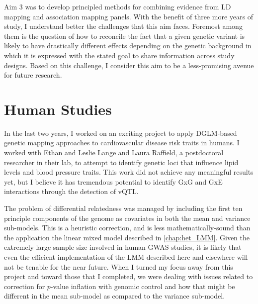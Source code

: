 Aim 3 was to develop principled methods for combining evidence from LD mapping and association mapping panels.
With the benefit of three more years of study, I understand better the challenges that this aim faces.
Foremost among them is the question of how to reconcile the fact that a given genetic variant is likely to have drastically different effects depending on the genetic background in which it is expressed with the stated goal to share information across study designs.
Based on this challenge, I consider this aim to be a less-promising avenue for future research.


\section{Human Studies}

In the last two years, I worked on an exciting project to apply DGLM-based genetic mapping approaches to cardiovascular disease risk traits in humans.
I worked with Ethan and Leslie Lange and Laura Raffield, a postdoctoral researcher in their lab, to attempt to identify genetic loci that influence lipid levels and blood pressure traits.
This work did not achieve any meaningful results yet, but I believe it has tremendous potential to identify GxG and GxE interactions through the detection of vQTL.

The problem of differential relatedness was managed by including the first ten principle components of the genome as covariates in both the mean and variance sub-models.
This is a heuristic correction, and is less mathematically-sound than the application the linear mixed model described in \autoref{chap:het_LMM}.
Given the extremely large sample size involved in human GWAS studies, it is likely that even the efficient implementation of the LMM described here and elsewhere \citep{Kang2008} will not be tenable for the near future.
When I turned my focus away from this project and toward those that I completed, we were dealing with issues related to correction for $p$-value inflation with genomic control and how that might be different in the mean sub-model as compared to the variance sub-model.




